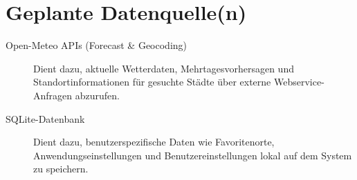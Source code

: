 \documentclass[12pt,a4paper]{article}
\begin{document}
\section{Geplante Datenquelle(n)}
\begin{description}
  \item [Open-Meteo APIs (Forecast \& Geocoding)] Dient dazu, aktuelle Wetterdaten, Mehrtagesvorhersagen und Standortinformationen für gesuchte Städte über externe Webservice-Anfragen abzurufen.
  \item [SQLite-Datenbank] Dient dazu, benutzerspezifische Daten wie Favoritenorte, Anwendungseinstellungen und Benutzereinstellungen lokal auf dem System zu speichern.
\end{description}
\end{document}

